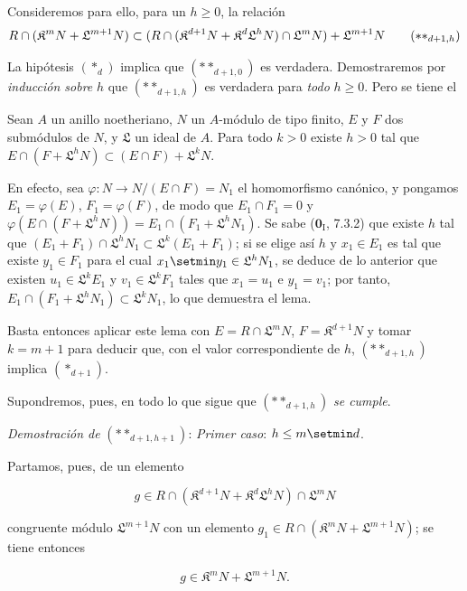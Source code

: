 Consideremos para ello, para un $h\geq0$, la relación
\begin{equation}
  R\cap(\mathfrak K^mN+\mathfrak L^{m+1}N)\subset(R\cap(\mathfrak K^{d+1}N+\mathfrak K^d\mathfrak L^hN)\cap\mathfrak L^mN)+\mathfrak L^{m+1}N
  \tag{$**_{d+1,h}$}
\end{equation}

La hipótesis $(*_d)$ implica que $(**_{d+1,0})$ es verdadera. Demostraremos por \emph{inducción sobre} $h$ que $(**_{d+1,h})$ es verdadera para \emph{todo} $h\geq0$. Pero se tiene el

\begin{lemma}[19.7.1.7]
\label{IV.19.7.1.7}
Sean $A$ un anillo noetheriano, $N$ un $A$-módulo de tipo finito, $E$ y $F$ dos submódulos de $N$, y $\mathfrak L$ un ideal de $A$. Para todo $k>0$ existe $h>0$ tal que
$E\cap(F+\mathfrak L^hN)\subset(E\cap F)+\mathfrak L^kN$.
\end{lemma}

En efecto, sea $\varphi:N\to N/(E\cap F)=N_1$ el homomorfismo canónico, y pongamos $E_1=\varphi(E)$, $F_1=\varphi(F)$, de modo que $E_1\cap F_1=0$ y $\varphi(E\cap(F+\mathfrak L^hN))=E_1\cap(F_1+\mathfrak L^hN_1)$. Se sabe ($\mathbf{0}_{\mathrm I}$, 7.3.2) que existe $h$ tal que $(E_1+F_1)\cap\mathfrak L^hN_1\subset\mathfrak L^k(E_1+F_1)$; si se elige así $h$ y $x_1\in E_1$ es tal que existe $y_1\in F_1$ para el cual $x_1\setmin y_1\in\mathfrak L^hN_1$, se deduce de lo anterior que existen $u_1\in\mathfrak L^kE_1$ y $v_1\in\mathfrak L^kF_1$ tales que $x_1=u_1$ e $y_1=v_1$; por tanto, $E_1\cap(F_1+\mathfrak L^hN_1)\subset\mathfrak L^kN_1$, lo que demuestra el lema.

Basta entonces aplicar este lema con $E=R\cap\mathfrak L^mN$, $F=\mathfrak K^{d+1}N$ y tomar $k=m+1$ para deducir que, con el valor correspondiente de $h$, $(**_{d+1,h})$ implica $(*_{d+1})$.

Supondremos, pues, en todo lo que sigue que $(**_{d+1,h})$ \emph{se cumple}.

\begin{env}[19.7.1.8]
\label{IV.19.7.1.8}
\emph{Demostración de} $(**_{d+1,h+1})$: \emph{Primer caso}: $h\leq m\setmin d$.
\end{env}

Partamos, pues, de un elemento
\begin{env}[19.7.1.9]
\label{IV.19.7.1.9}
\[
  g\in R\cap(\mathfrak K^{d+1}N+\mathfrak K^d\mathfrak L^hN)\cap\mathfrak L^mN
\]
\end{env}
congruente módulo $\mathfrak L^{m+1}N$ con un elemento $g_1\in R\cap(\mathfrak K^mN+\mathfrak L^{m+1}N)$; se tiene entonces
\begin{env}[19.7.1.10]
\label{IV.19.7.1.10}
\[
  g\in\mathfrak K^mN+\mathfrak L^{m+1}N.
\]
\end{env}

